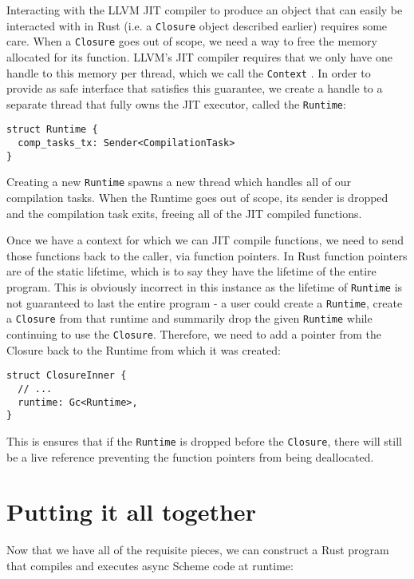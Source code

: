 \documentclass[sigplan]{acmart}
\begin{document}
Interacting with the LLVM JIT compiler to produce an object that can easily be
interacted with in Rust (i.e. a \texttt{Closure} object described earlier)
requires some care. When a \texttt{Closure} goes out of scope, we need a way to
free the memory allocated for its function. LLVM's JIT compiler requires that
we only have one handle to this memory per thread, which we call the
\texttt{Context} \cite{context}. In order to provide as safe interface that
satisfies this guarantee, we create a handle to a separate thread that fully owns
the JIT executor, called the \texttt{Runtime}:

\begin{verbatim}
struct Runtime {
  comp_tasks_tx: Sender<CompilationTask>
}
\end{verbatim}

Creating a new \texttt{Runtime} spawns a new thread which handles all of our
compilation tasks. When the Runtime goes out of scope, its sender is dropped
and the compilation task exits, freeing all of the JIT compiled functions.

Once we have a context for which we can JIT compile functions, we need to send
those functions back to the caller, via function pointers. In Rust function
pointers are of the static lifetime, which is to say they have the lifetime of
the entire program. This is obviously incorrect in this instance as the lifetime
of \texttt{Runtime} is not guaranteed to last the entire program - a user could
create a \texttt{Runtime}, create a \texttt{Closure} from that runtime and
summarily drop the given \texttt{Runtime} while continuing to use the
\texttt{Closure}. Therefore, we need to add a pointer from the Closure back to
the Runtime from which it was created:

\begin{verbatim}
struct ClosureInner {
  // ...
  runtime: Gc<Runtime>,
}
\end{verbatim}

This is ensures that if the \texttt{Runtime} is dropped before the
\texttt{Closure}, there will still be a live reference preventing the function
pointers from being deallocated.

\section{Putting it all together}

Now that we have all of the requisite pieces, we can construct a Rust program
that compiles and executes async Scheme code at runtime:
\end{document}
